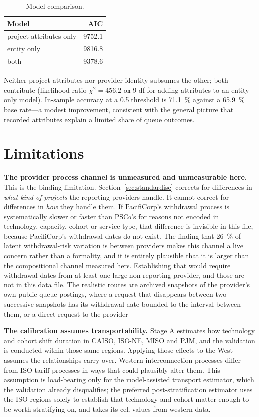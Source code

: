 \documentclass[11pt,a4paper]{article}
\begin{document}
\begin{table}[htbp]
\centering
\caption{Model comparison.}
\begin{tabular}{lr}
\toprule
Model & AIC \\
\midrule
project attributes only & \num{9752.1} \\
entity only             & \num{9816.8} \\
both                    & \num{9378.6} \\
\bottomrule
\end{tabular}
\end{table}

Neither project attributes nor provider identity subsumes the other; both
contribute (likelihood-ratio $\chi^2 = 456.2$ on 9 df for adding attributes to an
entity-only model). In-sample accuracy at a 0.5 threshold is \SI{71.1}{\percent}
against a \SI{65.9}{\percent} base rate---a modest improvement, consistent with
the general picture that recorded attributes explain a limited share of queue
outcomes.

\section{Limitations}

\textbf{The provider process channel is unmeasured and unmeasurable here.} This
is the binding limitation. Section~\ref{sec:standardise} corrects for differences
in \emph{what kind of projects} the reporting providers handle. It cannot correct
for differences in \emph{how} they handle them. If PacifiCorp's withdrawal
process is systematically slower or faster than PSCo's for reasons not encoded in
technology, capacity, cohort or service type, that difference is invisible in
this file, because PacifiCorp's withdrawal dates do not exist. The finding that
\SI{26}{\percent} of latent withdrawal-risk variation is between providers makes
this channel a live concern rather than a formality, and it is entirely plausible
that it is larger than the compositional channel measured here. Establishing that
would require withdrawal dates from at least one large non-reporting
provider, and those are not in this data file. The realistic routes are archived
snapshots of the provider's own public queue postings, where a request that
disappears between two successive snapshots has its withdrawal date bounded to
the interval between them, or a direct request to the provider.

\textbf{The calibration assumes transportability.} Stage A estimates how
technology and cohort shift duration in CAISO, ISO-NE, MISO and PJM, and the
validation is conducted within those same regions. Applying those effects to the
West assumes the relationships carry over. Western interconnection processes
differ from ISO tariff processes in ways that could plausibly alter them. This
assumption is load-bearing only for the model-assisted transport estimator, which
the validation already disqualifies; the preferred post-stratification estimator
uses the ISO regions solely to establish that technology and cohort matter enough
to be worth stratifying on, and takes its cell values from western data.
\end{document}
